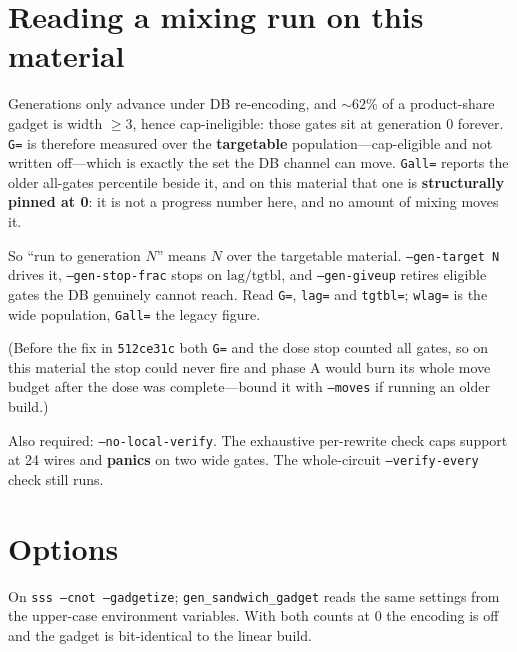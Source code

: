 \documentclass[11pt]{article}
\begin{document}
\section{Reading a mixing run on this material}

Generations only advance under DB re-encoding, and ${\sim}62\%$ of a
product-share gadget is width $\ge 3$, hence cap-ineligible: those gates sit at
generation 0 forever. \texttt{G=} is therefore measured over the
\textbf{targetable} population---cap-eligible and not written off---which is
exactly the set the DB channel can move. \texttt{Gall=} reports the older
all-gates percentile beside it, and on this material that one is
\textbf{structurally pinned at 0}: it is not a progress number here, and no
amount of mixing moves it.

So ``run to generation $N$'' means $N$ over the targetable material.
\texttt{--gen-target N} drives it, \texttt{--gen-stop-frac} stops on
$\mathrm{lag}/\mathrm{tgtbl}$, and \texttt{--gen-giveup} retires eligible gates
the DB genuinely cannot reach. Read \texttt{G=}, \texttt{lag=} and
\texttt{tgtbl=}; \texttt{wlag=} is the wide population, \texttt{Gall=} the
legacy figure.

(Before the fix in \texttt{512ce31c} both \texttt{G=} and the dose stop counted
all gates, so on this material the stop could never fire and phase A would burn
its whole move budget after the dose was complete---bound it with
\texttt{--moves} if running an older build.)

Also required: \texttt{--no-local-verify}. The exhaustive per-rewrite check caps
support at 24 wires and \textbf{panics} on two wide gates. The whole-circuit
\texttt{--verify-every} check still runs.

\section{Options}

On \texttt{sss --cnot --gadgetize}; \texttt{gen\_sandwich\_gadget} reads the same
settings from the upper-case environment variables. With both counts at 0 the
encoding is off and the gadget is bit-identical to the linear build.
\end{document}
